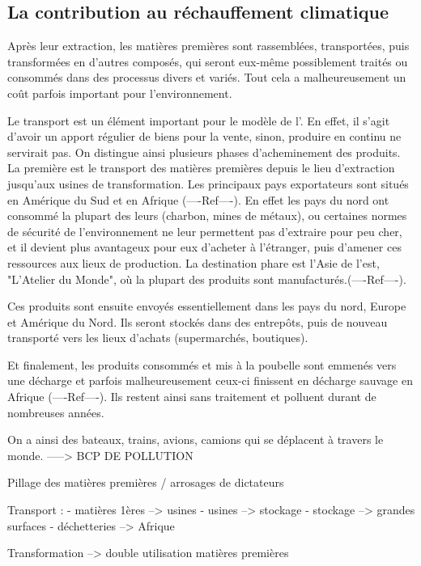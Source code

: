 
\subsection{La contribution au réchauffement climatique}


Après leur extraction, les matières premières sont rassemblées, transportées, puis transformées en d'autres composés, qui seront eux-même possiblement traités ou consommés dans des processus divers et variés. Tout cela a malheureusement un coût parfois important pour l'environnement.

\medbreak Le transport est un élément important pour le modèle de l'\op. En effet, il s'agit d'avoir un apport régulier de biens pour la vente, sinon, produire en continu ne servirait pas. On distingue ainsi plusieurs phases d'acheminement des produits.
\\
La première est le transport des matières premières depuis le lieu d'extraction jusqu'aux usines de transformation. Les principaux pays exportateurs sont situés en Amérique du Sud et en Afrique (----Ref----). En effet les pays du nord ont consommé la plupart des leurs (charbon, mines de métaux), ou certaines normes de sécurité de l'environnement ne leur permettent pas d'extraire pour peu cher, et il devient plus avantageux pour eux d'acheter à l'étranger, puis d'amener ces ressources aux lieux de production. La destination phare est l'Asie de l'est, "L'Atelier du Monde", où la plupart des produits sont manufacturés.(----Ref----).

Ces produits sont ensuite envoyés essentiellement dans les pays du nord, Europe et Amérique du Nord. Ils seront stockés dans des entrepôts, puis de nouveau transporté vers les lieux d'achats (supermarchés, boutiques). 

Et finalement, les produits consommés et mis à la poubelle sont emmenés vers une décharge et parfois malheureusement ceux-ci finissent en décharge sauvage en Afrique (----Ref----). Ils restent ainsi sans traitement et polluent durant de nombreuses années.

On a ainsi des bateaux, trains, avions, camions qui se déplacent à travers le monde. 
-----> BCP DE POLLUTION


Pillage des matières premières / arrosages de dictateurs

Transport : 
 - matières 1ères --> usines
 - usines --> stockage
 - stockage --> grandes surfaces
 - déchetteries --> Afrique

Transformation
--> double utilisation matières premières


